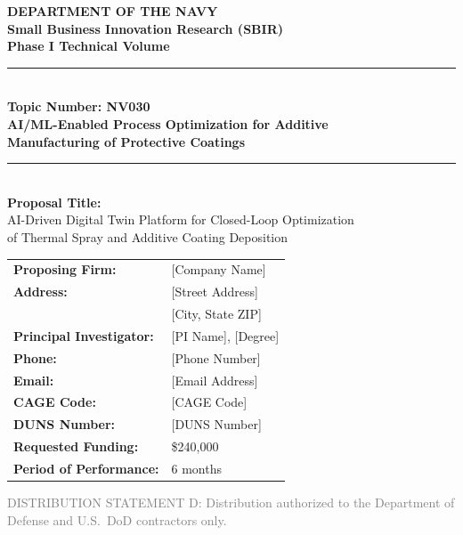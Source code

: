 \documentclass[11pt,letterpaper]{article}
\begin{document}

\begin{center}
\vspace*{1cm}
{\large\textcolor{navyblue}{\textbf{DEPARTMENT OF THE NAVY}}}\\[0.3cm]
{\large\textbf{Small Business Innovation Research (SBIR)}}\\[0.2cm]
{\large\textbf{Phase I Technical Volume}}\\[0.8cm]

\noindent\textcolor{navyblue}{\rule{0.8\textwidth}{1.5pt}}\\[0.5cm]

{\Large\textbf{Topic Number: NV030}}\\[0.3cm]
{\Large\textbf{AI/ML-Enabled Process Optimization for Additive}}\\
{\Large\textbf{Manufacturing of Protective Coatings}}\\[0.5cm]

\noindent\textcolor{navyblue}{\rule{0.8\textwidth}{1.5pt}}\\[0.8cm]

{\large\textbf{Proposal Title:}}\\[0.2cm]
{\large AI-Driven Digital Twin Platform for Closed-Loop Optimization}\\
{\large of Thermal Spray and Additive Coating Deposition}\\[0.8cm]

\begin{tabular}{ll}
\textbf{Proposing Firm:} & [Company Name] \\
\textbf{Address:} & [Street Address] \\
 & [City, State ZIP] \\
\textbf{Principal Investigator:} & [PI Name], [Degree] \\
\textbf{Phone:} & [Phone Number] \\
\textbf{Email:} & [Email Address] \\
\textbf{CAGE Code:} & [CAGE Code] \\
\textbf{DUNS Number:} & [DUNS Number] \\
\textbf{Requested Funding:} & \$240,000 \\
\textbf{Period of Performance:} & 6 months \\
\end{tabular}

\vfill
{\small\textcolor{gray}{DISTRIBUTION STATEMENT D: Distribution authorized to the
Department of Defense and U.S.\ DoD contractors only.}}
\end{center}
\end{document}
